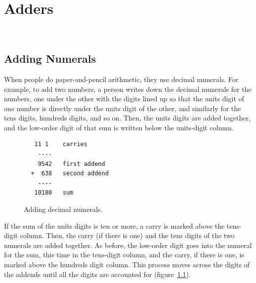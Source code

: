 \chapter{Adders}
\label{ch:adders}\


\section{Adding Numerals}
\label{sec:addition-by-numeral}

When people do paper-and-pencil
arithmetic,
they use decimal numerals.
For example, to add two numbers, a person
writes down the decimal numerals for the numbers,
one under the other with the digits lined up so that
the units digit of one number is directly under
the units digit of the other, and similarly for
the tens digits, hundreds digits, and so on.
Then, the units digits are added together,
and the low-order digit of that sum is written
below the units-digit column.

\begin{figure}
\begin{minipage}[b]{0.4\textwidth}
\begin{verbatim}
   11 1    carries
    ----
    9542   first addend
  +  638   second addend
    ----
   10180   sum
\end{verbatim}
\end{minipage}
\caption{Adding decimal numerals.}
\label{fig:adding-decimal-numerals}
\end{figure}

If the sum of the units digits is ten or more, a
carry
is marked above the tens-digit column.
Then, the carry (if there is one) and
the tens digits of the two numerals are added together.
As before, the low-order digit
goes into the numeral for the sum, this time in the
tens-digit column, and the carry,
if there is one, is marked
above the hundreds digit column.
This process moves across the digits of the addends until all the digits
are accounted for (figure~\ref{fig:adding-decimal-numerals}).

